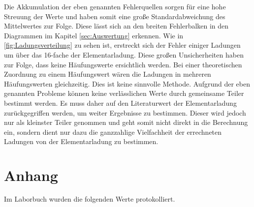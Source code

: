 \noindent Die Akkumulation der eben genannten Fehlerquellen sorgen für eine hohe Streuung der Werte und haben somit 
eine große Standardabweichung des Mittelwertes zur Folge. Diese lässt sich an den breiten Fehlerbalken in den Diagrammen 
im Kapitel \ref{sec:Auswertung} erkennen. Wie in \autoref{fig:Ladungsverteilung} zu sehen ist, erstreckt sich der Fehler 
einiger Ladungen um über das 16-fache der Elementarladung. Diese großen Unsicherheiten haben zur Folge, dass keine 
Häufungswerte ersichtlich werden. Bei einer theoretischen Zuordnung zu einem Häufungswert wären die Ladungen in mehreren 
Häufungswerten gleichzeitig. Dies ist keine sinnvolle Methode. Aufgrund der eben genannten Probleme können keine 
verlässlichen Werte durch gemeinsame Teiler bestimmt werden. Es muss daher auf den Literaturwert der Elementarladung 
zurückgegriffen werden, um weiter Ergebnisse zu bestimmen. Dieser wird jedoch nur als kleinster Teiler genommen und geht 
somit nicht direkt in die Berechnung ein, sondern dient nur dazu die ganzzahlige Vielfachheit der errechneten Ladungen von der Elementarladung 
zu bestimmen.


\section{Anhang}

Im Laborbuch wurden die folgenden Werte protokolliert.

